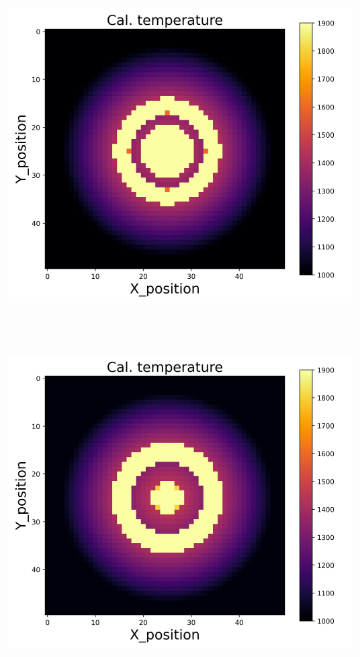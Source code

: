 {\begin{figure}[p]
\begin{minipage}{\textwidth}
\begin{subfigure}{0.325\textwidth}
        \end{subfigure}
        \begin{subfigure}{0.325\textwidth}
            \centering
            \includegraphics[width=\textwidth]{figures/raw_data/24/quad/T_cal.jpg}
        \end{subfigure}
    \end{minipage}\\
    \begin{minipage}{\textwidth}
        \centering
        \begin{subfigure}{0.325\textwidth}
            \centering
            \includegraphics[width=\textwidth]{figures/raw_data/25/quad/T_cal.jpg}

\end{subfigure}
\end{minipage}
\end{figure}}
